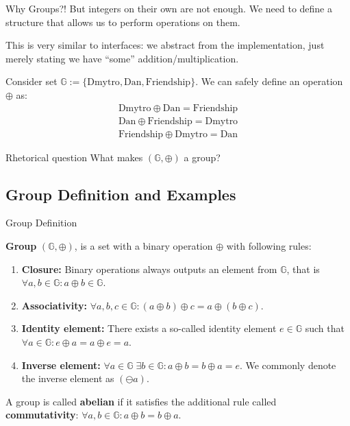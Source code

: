 \documentclass{beamer}
\begin{document}
    \begin{frame}{Why Groups?!}
        But integers on their own are not enough. We need to define a structure that allows us to perform operations on them.

        This is very similar to interfaces: we abstract from the implementation, just merely stating we have ``some'' addition/multiplication.

        \begin{example}
            Consider set $\mathbb{G} := \{\text{Dmytro}, \text{Dan}, \text{Friendship}\}$. We can safely define an operation $\oplus$ as:
            \begin{gather*}
                \text{Dmytro} \oplus \text{Dan} = \text{Friendship} \\ 
                \text{Dan} \oplus \text{Friendship} = \text{Dmytro} \\
                \text{Friendship} \oplus \text{Dmytro} = \text{Dan}
            \end{gather*}
        \end{example}
        \pause

        \begin{block}{Rhetorical question}
            What makes $(\mathbb{G}, \oplus)$ a group?
        \end{block}
    \end{frame}
    \subsection{Group Definition and Examples}
    \begin{frame}{Group Definition}
      \begin{definition}
        \textbf{Group} $(\mathbb{G}, \oplus)$, is a set with a binary operation $\oplus$ with following rules:
        \begin{enumerate}
            \item \textbf{Closure:} Binary operations always outputs an element from $\mathbb{G}$, that is $\forall a,b \in \mathbb{G}: a \oplus b \in \mathbb{G}$.\pause
            \item \textbf{Associativity:} $\forall a,b,c \in \mathbb{G}: (a \oplus b)\oplus c = a \oplus (b \oplus c)$.\pause
            \item \textbf{Identity element:} There exists a so-called identity element $e \in \mathbb{G}$ such that $\forall a \in \mathbb{G}: e \oplus a = a \oplus e = a$.\pause
            \item \textbf{Inverse element:} $\forall a \in \mathbb{G} \; \exists b \in \mathbb{G}: a\oplus b = b \oplus a = e$. We commonly denote the inverse element as $(\ominus a)$. \pause
        \end{enumerate}
    \end{definition}

    \begin{definition}
        A group is called \textbf{abelian} if it satisfies the additional rule called \textbf{commutativity}: $\forall a,b \in \mathbb{G}: a \oplus b = b \oplus a$.
    \end{definition}
    \end{frame}
\end{document}
